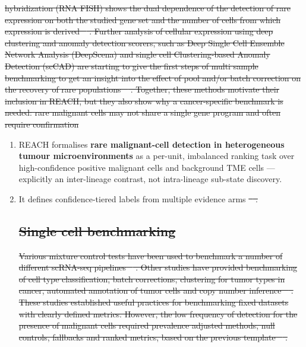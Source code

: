 \documentclass[10pt]{article}
\providecommand{\DIFaddtex}[1]{{\protect\color{trackgreen}#1}} %
\providecommand{\DIFdeltex}[1]{{\protect\color{red}\sout{#1}}}                      %
\providecommand{\DIFaddbegin}{} %
\providecommand{\DIFaddend}{} %
\providecommand{\DIFdelbegin}{} %
\providecommand{\DIFdelend}{} %
\providecommand{\DIFadd}[1]{\texorpdfstring{\DIFaddtex{#1}}{#1}} %
\providecommand{\DIFdel}[1]{\texorpdfstring{\DIFdeltex{#1}}{}} %
\newcommand{\DIFscaledelfig}{0.5}
\newlength{\DIFdelgraphicswidth} %
\newlength{\DIFdelgraphicsheight} %
\newcommand{\DIFaddincludegraphics}[2][]{{\color{trackgreen}\fbox{\DIFOincludegraphics[#1]{#2}}}} %
\newcommand{\DIFdelincludegraphics}[2][]{%
\sbox{\DIFdelgraphicsbox}{\DIFOincludegraphics[#1]{#2}}%
\settoboxwidth{\DIFdelgraphicswidth}{\DIFdelgraphicsbox} %
\settoboxtotalheight{\DIFdelgraphicsheight}{\DIFdelgraphicsbox} %
\scalebox{\DIFscaledelfig}{%
\parbox[b]{\DIFdelgraphicswidth}{\usebox{\DIFdelgraphicsbox}\\[-\baselineskip] \rule{\DIFdelgraphicswidth}{0em}}\llap{\resizebox{\DIFdelgraphicswidth}{\DIFdelgraphicsheight}{%
\setlength{\unitlength}{\DIFdelgraphicswidth}%
\begin{picture}(1,1)%
\thicklines\linethickness{2pt} %
{\color[rgb]{1,0,0}\put(0,0){\framebox(1,1){}}}%
{\color[rgb]{1,0,0}\put(0,0){\line( 1,1){1}}}%
{\color[rgb]{1,0,0}\put(0,1){\line(1,-1){1}}}%
\end{picture}%
}\hspace*{3pt}}} %
} %
\DeclareRobustCommand{\DIFaddbegin}{\DIFOaddbegin \let\includegraphics\DIFaddincludegraphics} %
\DeclareRobustCommand{\DIFaddend}{\DIFOaddend \let\includegraphics\DIFOincludegraphics} %
\DeclareRobustCommand{\DIFdelbegin}{\DIFOdelbegin \let\includegraphics\DIFdelincludegraphics} %
\DeclareRobustCommand{\DIFdelend}{\DIFOaddend \let\includegraphics\DIFOincludegraphics} %
\providecommand{\tightlist}{\setlength{\itemsep}{0pt}\setlength{\parskip}{0pt}}
\begin{document}
\DIFdel{hybridization (RNA FISH) shows the dual dependence of the detection of rare expression on both the studied gene set and the number of cells from which expression is derived \mbox{%
\cite{torre2018rare}}\hskip0pt%
. Further analysis of cellular expression using deep clustering and anomaly detection scorers, such as Deep Single Cell Ensemble Network Analysis (DeepScena) and single cell Clustering-based Anomaly Detection (scCAD) are starting to give the first steps of multi sample benchmarking to get an insight into the effect of pool and/or batch correction on the recovery of rare populations \mbox{%
\cite{lei2023self,xu2024sccad}}\hskip0pt%
. Together, these methods motivate their inclusion in REACH, but they also show why a cancer-specific benchmark is needed: rare malignant cells may not
  share a single gene program and often require confirmation }\DIFdelend \DIFaddbegin \begin{enumerate}
\def\labelenumi{\arabic{enumi}.}
\tightlist
\item
  \DIFadd{REACH formalises }\textbf{\DIFadd{rare malignant-cell detection in
  heterogeneous tumour microenvironments}} \DIFadd{as a per-unit, imbalanced
  ranking task over high-confidence positive malignant cells and
  background TME cells --- explicitly an inter-lineage contrast, not
  intra-lineage sub-state discovery.
}\item
  \DIFadd{It defines confidence-tiered labels }\DIFaddend from multiple evidence arms \DIFdelbegin \DIFdel{\mbox{%
\cite{tirosh2024cancer,ren2018understanding}}\hskip0pt%
.
}%

\subsection{\DIFdel{Single cell benchmarking}}
\addtocounter{subsection}{-1}%

\DIFdel{Various mixture control tests have been used to benchmark a number of different scRNA-seq pipelines \mbox{%
\cite{tian2019benchmarking}}\hskip0pt%
. Other studies have provided benchmarking of cell type classification, batch corrections, clustering for tumor types in cancer, automated annotation of tumor cells  and copy number inference \mbox{%
\cite{abdelaal2019comparison,tran2020benchmark,mahalanabis2022evaluation,chen2025benchmarking,christensen2023evaluation}}\hskip0pt%
. These studies established useful practices for benchmarking fixed datasets with clearly defined metrics. However, the low frequency of detection for the presence of malignant cells required prevalence adjusted methods, null controls, fallbacks and ranked metrics, based on the previous template \mbox{%
\cite{davis2006relationship,saito2015precision,johnson2019survey}}\hskip0pt%
.
}%


\end{enumerate}
\end{document}
